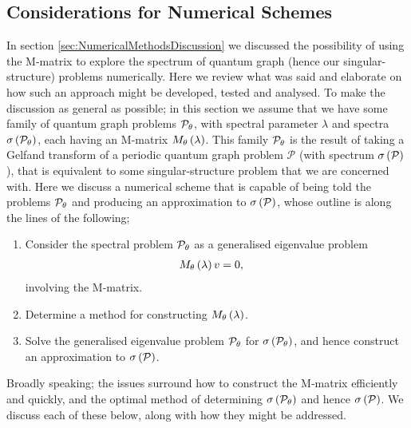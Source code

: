 \subsection{Considerations for Numerical Schemes} \label{sec:ConcFutureNumerical}
In section \ref{sec:NumericalMethodsDiscussion} we discussed the possibility of using the M-matrix to explore the spectrum of quantum graph (hence our singular-structure) problems numerically.
Here we review what was said and elaborate on how such an approach might be developed, tested and analysed.
To make the discussion as general as possible; in this section we assume that we have some family of quantum graph problems $\mathcal{P}_{\theta}$, with spectral parameter $\lambda$ and spectra $\sigma\left( \mathcal{P}_{\theta} \right)$, each having an M-matrix $M_{\theta}\left( \lambda \right)$.
This family $\mathcal{P}_{\theta}$ is the result of taking a Gelfand transform of a periodic quantum graph problem $\mathcal{P}$ (with spectrum $\sigma\left( \mathcal{P} \right)$), that is equivalent to some singular-structure problem that we are concerned with.
Here we discuss a numerical scheme that is capable of being told the problems $\mathcal{P}_{\theta}$ and producing an approximation to $\sigma\left( \mathcal{P} \right)$, whose outline is along the lines of the following;
\begin{enumerate}
	\item Consider the spectral problem $\mathcal{P}_{\theta}$ as a generalised eigenvalue problem
	\begin{align*}
		M_{\theta}\left( \lambda \right) v &= 0,
	\end{align*}
	involving the M-matrix.
	\item Determine a method for constructing $M_{\theta}\left( \lambda \right)$.
	\item Solve the generalised eigenvalue problem $\mathcal{P}_{\theta}$ for $\sigma\left( \mathcal{P}_{\theta} \right)$, and hence construct an approximation to $\sigma\left( \mathcal{P} \right)$.
\end{enumerate}
Broadly speaking; the issues surround how to construct the M-matrix efficiently and quickly, and the optimal method of determining $\sigma\left( \mathcal{P}_{\theta} \right)$ and hence $\sigma\left( \mathcal{P} \right)$.
We discuss each of these below, along with how they might be addressed. \newline

